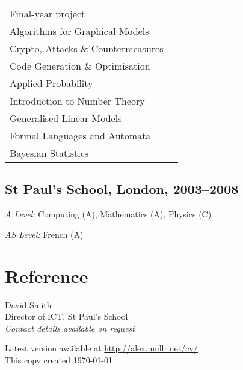 \documentclass[10pt,a4paper]{article}
\renewenvironment{itemize}{
  \begin{list}{}{
    \setlength{\leftmargin}{1.5em}
    \setlength{\itemsep}{0.25em}
    \setlength{\parskip}{0pt}
    \setlength{\parsep}{0.25em}
  }
}{
  \end{list}
}
\begin{document}
\begin{small}
\begin{minipage}[t]{0.5\textwidth}
\begin{tabular}{ p{6cm} p{1cm} }
  Final-year project                 \\ %
  Algorithms for Graphical Models    \\ %
  Crypto, Attacks \& Countermeasures \\ %
  Code Generation \& Optimisation    \\ %
  Applied Probability                \\ %
  Introduction to Number Theory      \\ %
  Generalised Linear Models          \\ %
  Formal Languages and Automata      \\ %
  Bayesian Statistics                \\ %
\end{tabular}

\end{minipage}
\end{small}

\subsection*{St Paul's School, London, 2003--2008}

\begin{itemize}
  \item \textit{A Level:} Computing (A), Mathematics (A), Physics (C)
  \begin{small}
    \item \textit{AS Level:} French (A)
  \end{small}
\end{itemize}

\section*{Reference}

\href{http://preoccupations.org/}{David Smith} \\
Director of ICT, St Paul's School \\
\emph{Contact details available on request} \\

\medskip

\begin{flushright}
  \begin{footnotesize}
    Latest version available at \url{http://alex.mullr.net/cv/} \\
    This copy created \today
  \end{footnotesize}
\end{flushright}
\end{document}
